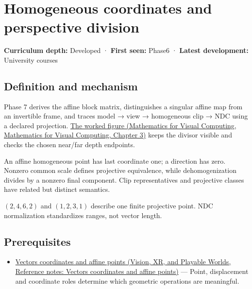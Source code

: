 \hypertarget{appendix-cb3b26862282}{}\label{referencestart:appendix-cb3b26862282}
\section{Homogeneous coordinates and perspective division}\label{appendix-cb3b26862282-homogeneous-coordinates-and-perspective-division}

\textbf{Curriculum depth:} Developed · \textbf{First seen:} Phase6 · \textbf{Latest development:} University courses

\subsection{Definition and mechanism}\label{appendix-cb3b26862282-definition-and-mechanism}

Phase 7 derives the affine block matrix, distinguishes a singular affine map from an invertible frame, and traces model → view → homogeneous clip → NDC using a declared projection. \href{../02-Mathematics-for-Visual-Computing/main.pdf\#nameddest=01-foundations-i-ch019-figure-m6---follow-one-point-through-named-spaces}{The worked figure (Mathematics for Visual Computing, Mathematics for Visual Computing, Chapter 3)} keeps the divisor visible and checks the chosen near/far depth endpoints.

An affine homogeneous point has last coordinate one; a direction has zero. Nonzero common scale defines projective equivalence, while dehomogenization divides by a nonzero final component. Clip representatives and projective classes have related but distinct semantics.

\((2,4,6,2)\) and \((1,2,3,1)\) describe one finite projective point. NDC normalization standardizes ranges, not vector length.

\subsection{Prerequisites}\label{appendix-cb3b26862282-prerequisites}

\begin{itemize}
\tightlist
\item
  \href{../07-Vision-XR-and-Playable-Worlds/main.pdf\#nameddest=appendix-0659864c0aa3}{Vectors coordinates and affine points (Vision, XR, and Playable Worlds, Reference notes: Vectors coordinates and affine points)} --- Point, displacement and coordinate roles determine which geometric operations are meaningful.
\end{itemize}

